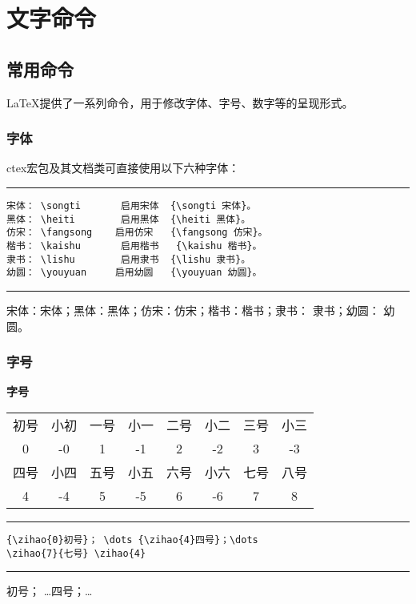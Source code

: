\section{文字命令}
\subsection{常用命令}
\LaTeX 提供了一系列命令，用于修改字体、字号、数字等的呈现形式。
\subsubsection{字体}
ctex宏包及其文档类可直接使用以下六种字体：
\vspace{1em}\noindent\hrule
\begin{verbatim}
宋体： \songti       启用宋体  {\songti 宋体}。
黑体： \heiti        启用黑体  {\heiti 黑体}。
仿宋： \fangsong    启用仿宋   {\fangsong 仿宋}。
楷书： \kaishu       启用楷书   {\kaishu 楷书}。
隶书： \lishu        启用隶书  {\lishu 隶书}。
幼圆： \youyuan     启用幼圆   {\youyuan 幼圆}。
\end{verbatim}
\noindent\hrule\vspace{1em}

宋体：{\songti 宋体}；黑体：{\heiti 黑体}；仿宋：{\fangsong 仿宋}；楷书：{\kaishu 楷书}；隶书： {\lishu 隶书}；幼圆： {\youyuan 幼圆}。
\subsubsection{字号}
{\bf 字号}%

\begin{center}
	\begin{tabular}{cccccccc}
		\toprule
		初号 & 小初 & 一号 & 小一 & 二号 & 小二 & 三号 & 小三 \\
		0    & -0   & 1    & -1   & 2    & -2   & 3    & -3   \\
		\hline
		四号 & 小四 & 五号 & 小五 & 六号 & 小六 & 七号 & 八号 \\
		4    & -4   & 5    & -5   & 6    & -6   & 7    & 8    \\
		\bottomrule
	\end{tabular}
\end{center}

\vspace{1em}\noindent\hrule
\begin{verbatim}
{\zihao{0}初号}； \dots {\zihao{4}四号}；\dots 
\zihao{7}{七号} \zihao{4}
\end{verbatim}
\noindent\hrule\vspace{1em}

{初号}； \dots {四号}；\dots {}
